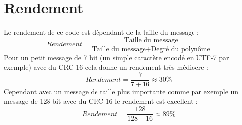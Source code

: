    \section{Rendement}

        \paragraph{}
Le rendement de ce code est dépendant de la taille du message :
\[  Rendement = \frac{\text{Taille du message}}{\text{Taille du message} + \text{Degré du polynôme}} \]
Pour un petit message de 7 bit (un simple caractère encodé en UTF-7 par exemple) avec du CRC 16 cela donne un rendement très médiocre :
\[  Rendement = \frac{7}{7 + 16} \approx 30\%  \]
Cependant avec un message de taille plus importante comme par exemple un message de 128 bit avec du CRC 16 le rendement est excellent :
\[  Rendement = \frac{128}{128 + 16} \approx 89\%  \]
